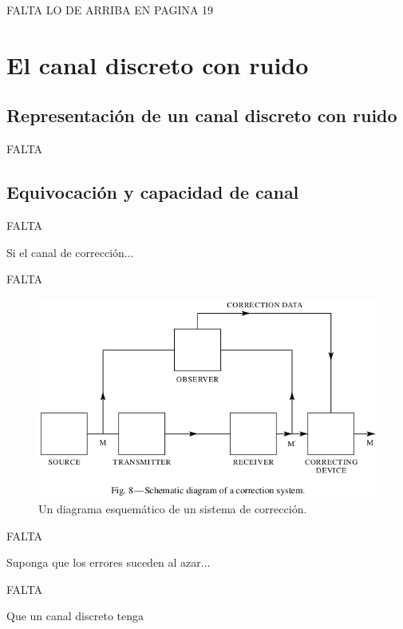 FALTA LO DE ARRIBA EN PAGINA 19

\part{El canal discreto con ruido}
\label{part:2}

\chapter{Representaci\'{o}n de un canal discreto con ruido}
\label{sec:11}

FALTA

\clearpage

\chapter{Equivocaci\'{o}n y capacidad de canal}
\label{sec:12}

FALTA

\begin{theorem}
\label{th:10}
Si el canal de correcci\'{o}n...
\end{theorem}

FALTA

\begin{figure}[!ht]
\centerline{\includegraphics[width=120mm]{Imagenes/Pagina21-Figura8.png}}
\caption{Un diagrama esquem\'{a}tico de un sistema de correcci\'{o}n.}
\label{fig:8}
\end{figure}

FALTA

\begin{exmp}
Suponga que los errores suceden al azar...
\end{exmp}

FALTA

\begin{theorem}
\label{th:11}
Que un canal discreto tenga
\end{theorem}

